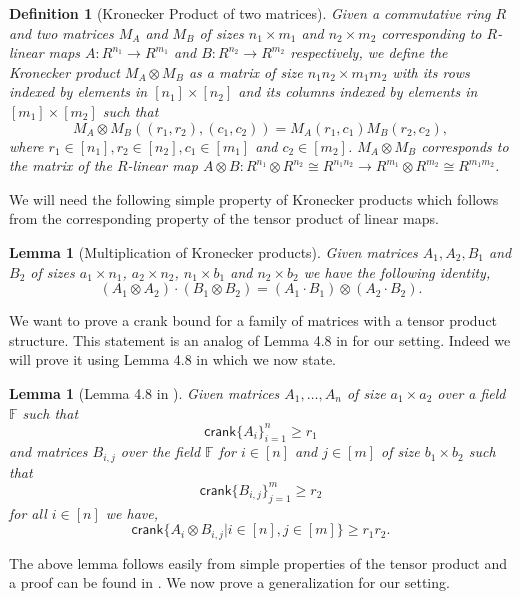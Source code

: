 \documentclass[11pt]{article}
\numberwithin{equation}{section}
\newtheorem{lem}[thm]{Lemma}
\newtheorem{define}[thm]{Definition}
\def\F{{\mathbb{F}}}
\def\crank{\textsf{crank}}
\begin{document}
\begin{define}[Kronecker Product of two matrices]
Given a commutative ring $R$ and two matrices $M_A$ and $M_B$ of sizes $n_1\times m_1$ and $n_2\times m_2$ corresponding to $R$-linear maps $A:R^{n_1}\rightarrow R^{m_1}$ and $B:R^{n_2}\rightarrow R^{m_2}$ respectively, we define the Kronecker product $M_A\otimes M_B$ as a matrix of size $n_1n_2\times m_1m_2$ with its rows indexed by elements in $[n_1]\times [n_2]$ and its columns indexed by elements in $[m_1]\times [m_2]$ such that
$$M_A\otimes M_B ((r_1,r_2),(c_1,c_2))=M_A(r_1,c_1)M_B(r_2,c_2),$$
where $r_1\in [n_1],r_2\in [n_2],c_1\in [m_1]$ and $c_2\in [m_2]$. $M_A\otimes M_B$ corresponds to the matrix of the $R$-linear map $A\otimes B: R^{n_1}\otimes R^{n_2}\cong R^{n_1n_2}\rightarrow R^{m_1}\otimes R^{m_2}\cong R^{m_1m_2}$.
\end{define}

We will need the following simple property of Kronecker products which follows from the corresponding property of the tensor product of linear maps.

\begin{lem}[Multiplication of Kronecker products]\label{fact:multOfKronecker}
Given matrices $A_1,A_2,B_1$ and $B_2$ of sizes $a_1\times n_1$, $a_2\times n_2$, $n_1\times b_1$ and $n_2\times b_2$ we have the following identity,
$$(A_1 \otimes A_2) \cdot (B_1\otimes B_2)=(A_1\cdot B_1)\otimes (A_2\cdot B_2).$$
\end{lem}


We want to prove a crank bound for a family of matrices with a tensor product structure. This statement is an analog of Lemma 4.8 in \cite{dhar2021proof} for our setting. Indeed we will prove it using Lemma 4.8 in \cite{dhar2021proof} which we now state.

\begin{lem}[Lemma 4.8 in \cite{dhar2021proof}]\label{lem:crankTensor}
Given matrices $A_1,\hdots,A_n$ of size $a_1\times a_2$ over a field $\F$ such that 
{\em $$\crank\{A_i\}_{i=1}^n\ge r_1$$} 
and matrices $B_{i,j}$ over the field $\F$ for $i\in [n]$ and $j\in [m]$ of size $b_1\times b_2$ such that 
{\em $$\crank\{B_{i,j}\}_{j=1}^m\ge r_2$$}
for all $i\in [n]$ we have,
\em{$$\crank\{A_i\otimes B_{i,j}|i\in [n],j\in[m]\}\ge r_1r_2.$$}
\end{lem}

The above lemma follows easily from simple properties of the tensor product and a proof can be found in \cite{dhar2021proof}. We now prove a generalization for our setting. 
\end{document}
